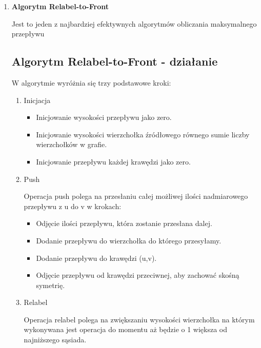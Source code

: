 \documentclass{article}
\begin{document}
{\begin{enumerate}
            Złożoność ta jest mniejsza niż np. dla algorytmu Bellmana-Forda - O(|V| * |E|), gdyż algorytm Dijkstry nie działa poprawnie dla grafów o wagach krawędzi ujemnych (takie nie wystąpią w programie).


        \item\textbf{Algorytm Relabel-to-Front}
        
        Jest to jeden z najbardziej efektywnych algorytmów obliczania maksymalnego przepływu 
        \subsection{Algorytm Relabel-to-Front - działanie}
        
        W algorytmie wyróżnia się trzy podstawowe kroki:
        
        \begin{enumerate}
            \item Inicjacja
            \begin{itemize}
                \item Inicjowanie wysokości przepływu jako zero.
                \item Inicjowanie wysokości wierzchołka źródłowego równego sumie liczby wierzchołków w grafie.
                \item Inicjowanie przepływu każdej krawędzi jako zero.
            \end{itemize}
            \item Push
            
            Operacja push polega na przesłaniu całej możliwej ilości nadmiarowego przepływu z u do v w krokach:
            \begin{itemize}
                \item Odjęcie ilości przepływu, która zostanie przesłana dalej.
                \item Dodanie przepływu do wierzchołka do którego przesyłamy.
                \item Dodanie przepływu do krawędzi (u,v).
                \item Odjęcie przepływu od krawędzi przeciwnej, aby zachować skośną symetrię.
            \end{itemize}
            \item Relabel
            
            Operacja relabel polega na zwiększaniu wysokości wierzchołka na którym wykonywana jest operacja do momentu aż będzie o 1 większa od najniższego sąsiada.
            

\end{enumerate}
\end{enumerate}}
\end{document}
